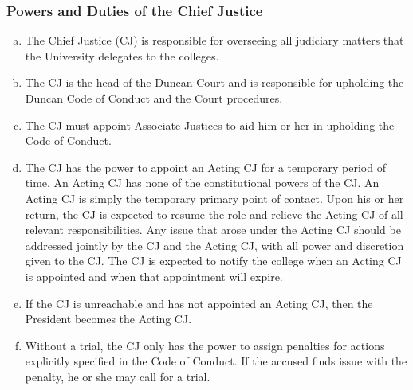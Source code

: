 \documentclass[USletter,12pt]{article}
\begin{document}
\subsubsection{Powers and Duties of the Chief Justice}
\begin{enumerate}[(a)]
\item The Chief Justice (CJ) is responsible for overseeing all judiciary matters that the University delegates to the colleges.
\item The CJ is the head of the Duncan Court and is responsible for upholding the Duncan Code of Conduct and the Court procedures.
\item The CJ must appoint Associate Justices to aid him or her in upholding the Code of Conduct.
\item The CJ has the power to appoint an Acting CJ for a temporary period of time.  An Acting CJ has none of the constitutional powers of the CJ.  An Acting CJ is simply the temporary primary point of contact.  Upon his or her return, the CJ is expected to resume the role and relieve the Acting CJ of all relevant responsibilities. Any issue that arose under the Acting CJ should be addressed jointly by the CJ and the Acting CJ, with all power and discretion given to the CJ. The CJ is expected to notify the college when an Acting CJ is appointed and when that appointment will expire.
\item If the CJ is unreachable and has not appointed an Acting CJ, then the President becomes the Acting CJ.
\item Without a trial, the CJ only has the power to assign penalties for actions explicitly specified in the Code of Conduct.  If the accused finds issue with the penalty, he or she may call for a trial.
\end{enumerate}
\end{document}
